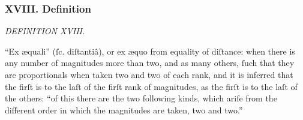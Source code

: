 \documentclass[12pt,preview]{standalone}
\begin{document}
\subsubsection{XVIII. Definition}

\begin{minipage}{\textwidth}

    \begin{center}
        \textit{DEFINITION XVIII.}\label{book5def18} \\
    \end{center}

    \hfill

    \raggedright “Ex \ae quali” (ſc. diſtantiâ), or ex æquo from equality of diſtance: when there is any number of magnitudes more than two, and as many others, ſuch that they are proportionals when taken two and two of each rank, and it is inferred that the firſt is to the laſt of the firſt rank of magnitudes, as the firſt is to the laſt of the others: “of this there are the two following kinds, which ariſe from the different order in which the magnitudes are taken, two and two.”

    \hfill

\end{minipage}
\end{document}
